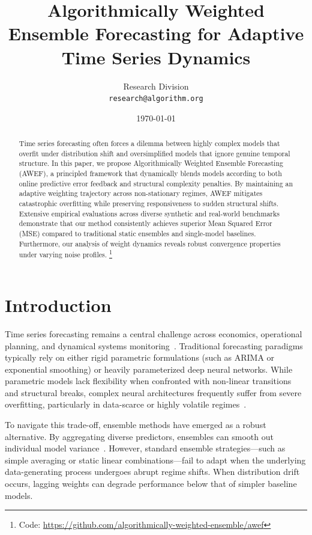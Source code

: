 \documentclass[11pt,letterpaper]{article}
\title{Algorithmically Weighted Ensemble Forecasting for Adaptive Time Series Dynamics}
\author{
    Research Division \\
    \texttt{research@algorithm.org}
}
\date{\today}
\begin{document}
\maketitle

\begin{abstract}
Time series forecasting often forces a dilemma between highly complex models that overfit under distribution shift and oversimplified models that ignore genuine temporal structure. In this paper, we propose Algorithmically Weighted Ensemble Forecasting (AWEF), a principled framework that dynamically blends models according to both online predictive error feedback and structural complexity penalties. By maintaining an adaptive weighting trajectory across non-stationary regimes, AWEF mitigates catastrophic overfitting while preserving responsiveness to sudden structural shifts. Extensive empirical evaluations across diverse synthetic and real-world benchmarks demonstrate that our method consistently achieves superior Mean Squared Error (MSE) compared to traditional static ensembles and single-model baselines. Furthermore, our analysis of weight dynamics reveals robust convergence properties under varying noise profiles. \footnote{Code: \url{https://github.com/algorithmically-weighted-ensemble/awef}}
\end{abstract}

\section{Introduction}
Time series forecasting remains a central challenge across economics, operational planning, and dynamical systems monitoring~\citep{Box1970}. Traditional forecasting paradigms typically rely on either rigid parametric formulations (such as ARIMA or exponential smoothing) or heavily parameterized deep neural networks. While parametric models lack flexibility when confronted with non-linear transitions and structural breaks, complex neural architectures frequently suffer from severe overfitting, particularly in data-scarce or highly volatile regimes~\citep{Makridakis2020}. 

To navigate this trade-off, ensemble methods have emerged as a robust alternative. By aggregating diverse predictors, ensembles can smooth out individual model variance~\citep{Breiman1996}. However, standard ensemble strategies—such as simple averaging or static linear combinations—fail to adapt when the underlying data-generating process undergoes abrupt regime shifts. When distribution drift occurs, lagging weights can degrade performance below that of simpler baseline models.
\end{document}
